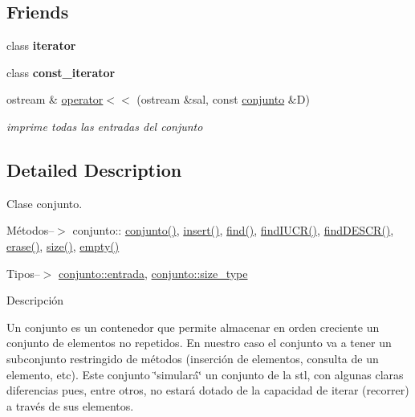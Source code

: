 \subsection*{Friends}
\begin{DoxyCompactItemize}
\item 
\hypertarget{classconjunto_a67171474c4da6cc8efe0c7fafefd2b2d}{class {\bfseries iterator}}\label{classconjunto_a67171474c4da6cc8efe0c7fafefd2b2d}

\item 
\hypertarget{classconjunto_ac220ce1c155db1ac44146c12d178056f}{class {\bfseries const\-\_\-iterator}}\label{classconjunto_ac220ce1c155db1ac44146c12d178056f}

\item 
ostream \& \hyperlink{classconjunto_ae54b721035471d372f29c0335c42734a}{operator$<$$<$} (ostream \&sal, const \hyperlink{classconjunto}{conjunto} \&D)
\begin{DoxyCompactList}\small\item\em imprime todas las entradas del conjunto \end{DoxyCompactList}\end{DoxyCompactItemize}


\subsection{Detailed Description}
Clase conjunto. 

Métodos--$>$ conjunto\-:\-: \hyperlink{classconjunto_a16d987f42c679efab01748178ba45891}{conjunto()}, \hyperlink{classconjunto_aa65b9f7c4cb9bad6d4e40c1973095930}{insert()}, \hyperlink{classconjunto_a2459d07b15a25a474f1be8dc0038feb5}{find()}, \hyperlink{classconjunto_a2ca2a7b59bce8369e9d9ccc1c7be9614}{find\-I\-U\-C\-R()}, \hyperlink{classconjunto_afff3e7f4b3d00f422dd7ab2fec935378}{find\-D\-E\-S\-C\-R()}, \hyperlink{classconjunto_ad550177fa4454da3a10fa356417e39a7}{erase()}, \hyperlink{classconjunto_a863e1e106e35adda47e7c5e2067295b9}{size()}, \hyperlink{classconjunto_afcf4ff3ff3c1f83b63e901efebe93533}{empty()}

Tipos--$>$ \hyperlink{classconjunto_a09cad766dd65de73e51eae21f9d22585}{conjunto\-::entrada}, \hyperlink{classconjunto_a855a5893bb0f5a851ab2dbf2b8aa6cc7}{conjunto\-::size\-\_\-type}

Descripción

Un conjunto es un contenedor que permite almacenar en orden creciente un conjunto de elementos no repetidos. En nuestro caso el conjunto va a tener un subconjunto restringido de métodos (inserción de elementos, consulta de un elemento, etc). Este conjunto \char`\"{}simulará\char`\"{} un conjunto de la stl, con algunas claras diferencias pues, entre otros, no estará dotado de la capacidad de iterar (recorrer) a través de sus elementos.

